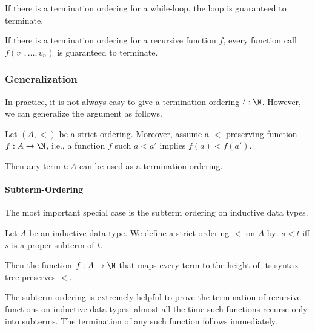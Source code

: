 If there is a termination ordering for a while-loop, the loop is guaranteed to terminate.

If there is a termination ordering for a recursive function $f$, every function call $f(v_1,\ldots,v_n)$ is guaranteed to terminate.

\subsubsection{Generalization}

In practice, it is not always easy to give a termination ordering $t:\N$.
However, we can generalize the argument as follows.

Let $(A,<)$ be a strict ordering.
Moreover, assume a $<$-preserving function $f:A\to \N$, i.e., a function $f$ such $a<a'$ implies $f(a)<f(a')$.

Then any term $t:A$ can be used as a termination ordering.

\paragraph{Subterm-Ordering}
The most important special case is the subterm ordering on inductive data types.

Let $A$ be an inductive data type.
We define a strict ordering $<$ on $A$ by: $s<t$ iff $s$ is a proper subterm of $t$.

Then the function $f:A\to \N$ that maps every term to the height of its syntax tree preserves $<$.

The subterm ordering is extremely helpful to prove the termination of recursive functions on inductive data types: almost all the time such functions recurse only into subterms.
The termination of any such function follows immediately.